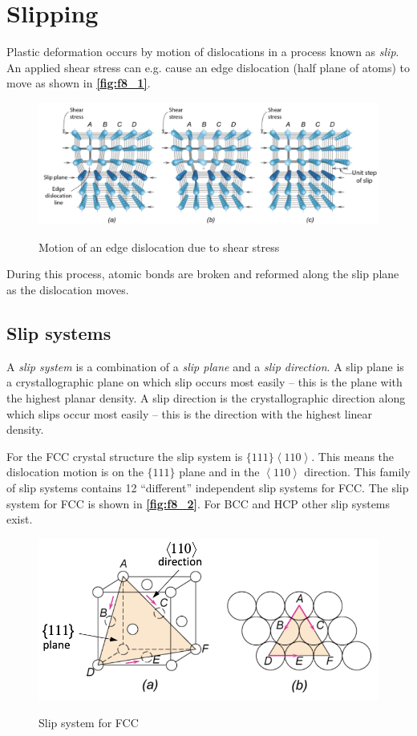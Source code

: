 
\section{Slipping}
Plastic deformation occurs by motion of dislocations in a process known as \textit{slip}. An applied shear stress can e.g. cause an edge dislocation (half plane of atoms) to move as shown in \textbf{\autoref{fig:f8_1}}.
\begin{figure} [ht]
  \centering
  \caption{Motion of an edge dislocation due to shear stress}
  \includegraphics[width=0.5\linewidth]{./figures/f8_1.png}
  \label{fig:f8_1}
\end{figure}
During this process, atomic bonds are broken and reformed along the slip plane as the dislocation moves.


\subsection{Slip systems}
A \textit{slip system} is a combination of a \textit{slip plane} and a \textit{slip direction}. A slip plane is a crystallographic plane on which slip occurs most easily -- this is the plane with the highest planar density. A slip direction is the crystallographic direction along which slips occur most easily -- this is the direction with the highest linear density. 

For the FCC crystal structure the slip system is $\{111\} \left\langle 110 \right\rangle $. This means the dislocation motion is on the $\{111\}$ plane and in the $\left\langle 110 \right\rangle$ direction. This family of slip systems contains 12 ``different'' independent slip systems for FCC. The slip system for FCC is shown in \textbf{\autoref{fig:f8_2}}. For BCC and HCP other slip systems exist.

\begin{figure} [ht]
  \centering
  \caption{Slip system for FCC}
  \includegraphics[width=0.5\linewidth]{./figures/f8_2.png}
  \label{fig:f8_2}
\end{figure}

